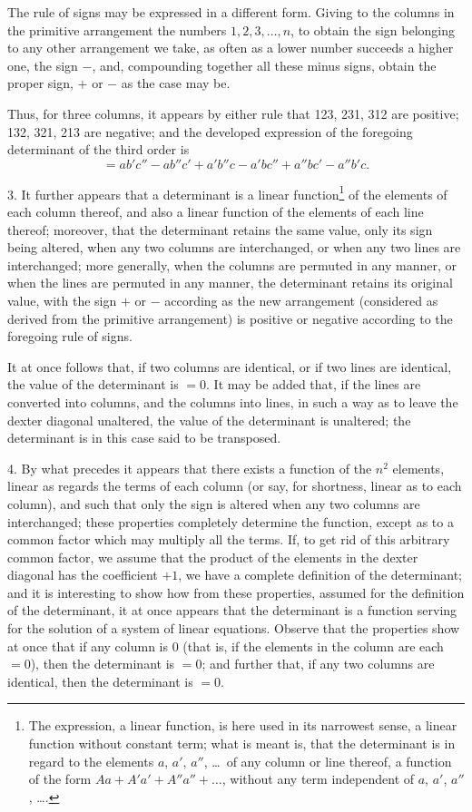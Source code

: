 \documentclass[12pt,a4paper,oneside]{book}
\begin{document}
The rule of signs may be expressed in a different form. Giving to the columns in the primitive arrangement the numbers $1,2,3,\dots,n$, to obtain the sign belonging to any other arrangement we take, as often as a lower number succeeds a higher one, the sign $-$, and, compounding together all these minus signs, obtain the proper sign, $+$ or $-$ as the case may be.

Thus, for three columns, it appears by either rule that 123, 231, 312 are positive; 132, 321, 213 are negative; and the developed expression of the foregoing determinant of the third order is
\[
=ab'c''-ab''c'+a'b''c-a'bc''+a''bc'-a''b'c.
\]

3. It further appears that a determinant is a linear function\footnote{The expression, a linear function, is here used in its narrowest sense, a linear function without constant term; what is meant is, that the determinant is in regard to the elements $a$, $a'$, $a''$, \dots\ of any column or line thereof, a function of the form $Aa+A'a'+A''a''+\dots$, without any term independent of $a$, $a'$, $a''$, \dots.} of the elements of each column thereof, and also a linear function of the elements of each line thereof; moreover, that the determinant retains the same value, only its sign being altered, when any two columns are interchanged, or when any two lines are interchanged; more generally, when the columns are permuted in any manner, or when the lines are permuted in any manner, the determinant retains its original value, with the sign $+$ or $-$ according as the new arrangement (considered as derived from the primitive arrangement) is positive or negative according to the foregoing rule of signs.

\newpage
It at once follows that, if two columns are identical, or if two lines are identical, the value of the determinant is $=0$. It may be added that, if the lines are converted into columns, and the columns into lines, in such a way as to leave the dexter diagonal unaltered, the value of the determinant is unaltered; the determinant is in this case said to be transposed.

4. By what precedes it appears that there exists a function of the $n^{2}$ elements, linear as regards the terms of each column (or say, for shortness, linear as to each column), and such that only the sign is altered when any two columns are interchanged; these properties completely determine the function, except as to a common factor which may multiply all the terms. If, to get rid of this arbitrary common factor, we assume that the product of the elements in the dexter diagonal has the coefficient $+1$, we have a complete definition of the determinant; and it is interesting to show how from these properties, assumed for the definition of the determinant, it at once appears that the determinant is a function serving for the solution of a system of linear equations. Observe that the properties show at once that if any column is $0$ (that is, if the elements in the column are each $=0$), then the determinant is $=0$; and further that, if any two columns are identical, then the determinant is $=0$.
\end{document}

